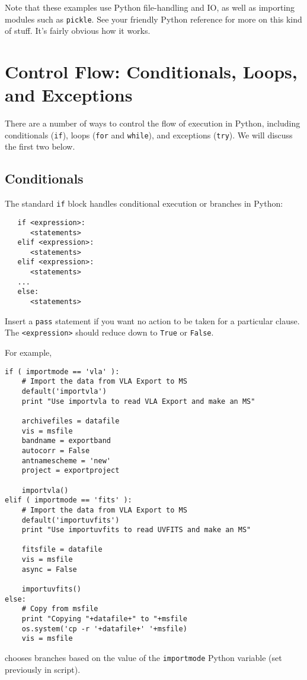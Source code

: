 Note that these examples use Python file-handling and IO, as well
as importing modules such as {\tt pickle}.  See your friendly
Python reference for more on this kind of stuff.  It's fairly obvious
how it works.

\section{Control Flow: Conditionals, Loops, and Exceptions}
\label{section:python.control}

There are a number of ways to control the flow of execution in
Python, including conditionals ({\tt if}), loops
({\tt for} and {\tt while}), and exceptions ({\tt try}).  We will
discuss the first two below.

\subsection{Conditionals}
\label{section:python.control.if}

The standard {\tt if} block handles conditional execution or branches
in Python:
\small
\begin{verbatim}
   if <expression>:
      <statements>
   elif <expression>:
      <statements>
   elif <expression>:
      <statements>
   ...
   else:
      <statements>

\end{verbatim}
\normalsize
Insert a {\tt pass} statement if you want no action to be taken
for a particular clause.  The {\tt <expression>} should reduce down
to {\tt True} or {\tt False}.

For example,
\small
\begin{verbatim}
if ( importmode == 'vla' ):
    # Import the data from VLA Export to MS
    default('importvla')
    print "Use importvla to read VLA Export and make an MS"
    
    archivefiles = datafile
    vis = msfile
    bandname = exportband
    autocorr = False
    antnamescheme = 'new'
    project = exportproject
    
    importvla()
elif ( importmode == 'fits' ):
    # Import the data from VLA Export to MS
    default('importuvfits')
    print "Use importuvfits to read UVFITS and make an MS"
   
    fitsfile = datafile
    vis = msfile
    async = False
    
    importuvfits()
else:
    # Copy from msfile
    print "Copying "+datafile+" to "+msfile
    os.system('cp -r '+datafile+' '+msfile)
    vis = msfile

\end{verbatim}
\normalsize
chooses branches based on the value of the {\tt importmode} Python
variable (set previously in script).

